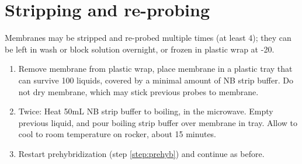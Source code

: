 \documentclass{article}
\newcommand{\degC}{\celsius\xspace}
\begin{document}

\section*{Stripping and re-probing}

Membranes may be stripped and re-probed multiple times (at least 4); they can be left in wash or block solution overnight, or frozen in plastic wrap at -20\degC.

\begin{enumerate}[resume]
\item Remove membrane from plastic wrap, place membrane in a plastic tray that can survive 100\degC liquids, covered by a minimal amount of NB strip buffer. Do not dry membrane, which may stick previous probes to membrane.
\item Twice: Heat 50mL NB strip buffer to boiling, in the microwave. Empty previous liquid, and pour boiling strip buffer over membrane in tray. Allow to cool to room temperature on rocker, about 15 minutes.
\item Restart prehybridization (step \ref{step:prehyb}) and continue as before.
\end{enumerate}
\end{document}
